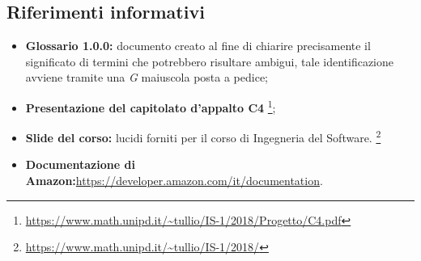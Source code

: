 \subsection{Riferimenti informativi}
\begin{itemize}
	
	\item \textbf{Glossario 1.0.0:} documento creato al fine di chiarire precisamente il significato di termini che potrebbero risultare ambigui, tale identificazione avviene tramite una \textit{G} maiuscola posta a pedice; 
	\item \textbf{Presentazione del capitolato d'appalto C4} \footnote{\url{https://www.math.unipd.it/~tullio/IS-1/2018/Progetto/C4.pdf}};
	\item \textbf{Slide del corso:} lucidi forniti per il corso di Ingegneria del Software. \footnote{\url{https://www.math.unipd.it/~tullio/IS-1/2018/}}
	\item \textbf{Documentazione di Amazon:}\url{https://developer.amazon.com/it/documentation}.
\end{itemize}
